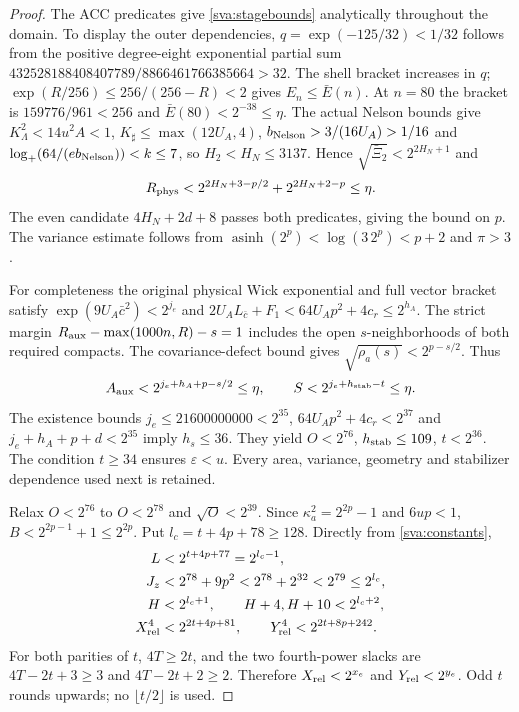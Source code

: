 \begin{proof}
The ACC predicates give \eqref{sva:stagebounds} analytically throughout
the domain. To display the outer dependencies, $q=\exp(-125/32)<1/32$
follows from the positive degree-eight exponential partial sum
$432528188408407789/8866461766385664>32$. The shell bracket increases
in $q$; $\exp(R/256)\le256/(256-R)<2$ gives $E_n\le\bar E(n)$.
At $n=80$ the bracket is $159776/961<256$ and
$\bar E(80)<2^{-38}\le\eta$. The actual Nelson bounds give
$K_\Lambda^2<14u^2A<1$, $K_\sharp\le\max(12U_A,4)$,
$b_{\rm Nelson}>3/(16U_A)>1/16$ and
$\log_+(64/(e b_{\rm Nelson}))<k\le7$, so $H_2<H_N\le3137$.
Hence $\sqrt{\bar\Xi_2}<2^{2H_N+1}$ and
\begin{equation}\label{sva:regulator}
 R_{\rm phys}<2^{2H_N+3-p/2}+2^{2H_N+2-p}\le\eta.
\end{equation}
The even candidate $4H_N+2d+8$ passes both predicates, giving the bound
on $p$. The variance estimate follows from
$\operatorname{asinh}(2^p)<\log(3\,2^p)<p+2$ and $\pi>3$.

For completeness the original physical Wick exponential and full
vector bracket satisfy $\exp(9U_A\bar c^2)<2^{j_e}$ and
$2U_A L_{\bar c}+F_1<64U_Ap^2+4c_r\le2^{h_A}$.
The strict margin $R_{\rm aux}-\max(1000n,R)-s=1$ includes the
open $s$-neighborhoods of both required compacts. The covariance-defect
bound gives $\sqrt{\rho_a(s)}<2^{p-s/2}$. Thus
\begin{equation}\label{sva:remaining-errors}
 A_{\rm aux}<2^{j_e+h_A+p-s/2}\le\eta,\qquad
 S<2^{j_e+h_{\rm stab}-t}\le\eta.
\end{equation}
The existence bounds $j_e\le21600000000<2^{35}$,
$64U_Ap^2+4c_r<2^{37}$ and $j_e+h_A+p+d<2^{35}$ imply $h_s\le36$.
They yield $O<2^{76}$, $h_{\rm stab}\le109$, $t<2^{36}$.
The condition $t\ge34$ ensures $\varepsilon<u$. Every area,
variance, geometry and stabilizer dependence used next is retained.

Relax $O<2^{76}$ to $O<2^{78}$ and $\sqrt O<2^{39}$. Since
$\kappa_a^2=2^{2p}-1$ and $6up<1$, $B<2^{2p-1}+1\le2^{2p}$.
Put $l_c=t+4p+78\ge128$. Directly from \eqref{sva:constants},
\begin{align}\label{sva:H-enclosure}
 L&<2^{t+4p+77}=2^{l_c-1},\nonumber\\
 J_z&<2^{78}+9p^2<2^{78}+2^{32}<2^{79}\le2^{l_c},\nonumber\\
 H&<2^{l_c+1},\qquad H+4,H+10<2^{l_c+2},\nonumber\\
 X_{\rm rel}^4&<2^{2t+4p+81},\qquad
 Y_{\rm rel}^4<2^{2t+8p+242}.
\end{align}
For both parities of $t$, $4T\ge2t$, and the two fourth-power slacks are
$4T-2t+3\ge3$ and $4T-2t+2\ge2$. Therefore
$X_{\rm rel}<2^{x_e}$ and $Y_{\rm rel}<2^{y_e}$. Odd $t$ rounds
upwards; no $\lfloor t/2\rfloor$ is used.


\end{proof}
